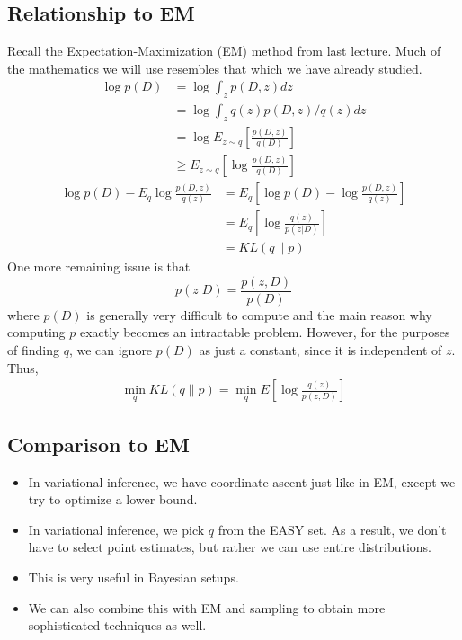 \documentclass{article}
\begin{document}
\subsection{Relationship to EM}
Recall the Expectation-Maximization (EM) method from last lecture.  Much of the mathematics we will use resembles that which we have already studied.
\begin{align*}
\log p(D) &= \log \int_{z} p(D,z) dz \tag{D is the observed data set} \\
&= \log \int_{z} q(z) p(D,z)/q(z) dz \\
&= \log E_{z \sim q} \left[ \frac{p(D,z)}{q(D)}\right]\\
&\geq E_{z \sim q} \left[\log \frac{p(D,z)}{q(D)}\right] \tag{the lower bound, by Jensen's inequality}
\end{align*}
\begin{align*}
\log p(D) - E_q \log \frac{p(D,z)}{q(z)} &= E_q \left[\log p(D) - \log \frac{p(D,z)}{q(z)}\right] \\
&= E_q \left[\log \frac{q(z)}{p(z|D)} \right] \\
&= KL(q \| p)
\end{align*}
One more remaining issue is that
$$p(z|D) = \frac{p(z, D)}{p(D)}$$
\newline where $p(D)$ is generally very difficult to compute and the main reason why computing $p$ exactly becomes an intractable problem.  However, for the purposes of finding $q$, we can ignore $p(D)$ as just a constant, since it is independent of $z$.  Thus,
\begin{align*}
    \min_q KL(q \| p) = \min_q E \left[\log \frac{q(z)}{p(z, D)} \right]
\end{align*}
\subsection*{Comparison to EM}
\begin{itemize}
\item In variational inference, we have coordinate ascent just like in EM, except we try to optimize a lower bound.
\item In variational inference, we pick $q$ from the EASY set. As a result, we don't have to select point estimates, but rather we can use entire distributions.
\item This is very useful in Bayesian setups.
\item We can also combine this with EM and sampling to obtain more sophisticated techniques as well.
\end{itemize}
\end{document}
